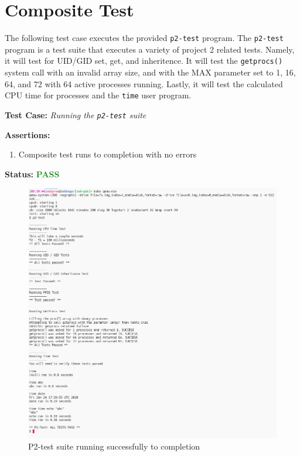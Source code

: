 \documentclass[11pt,letterpaper]{report}
\newcommand{\code}[1]{\colorbox{codegray}{\texttt{#1}}}
\begin{document}
{  \pagebreak

  \section*{Composite Test}
  The following test case executes the provided \code{p2-test} program. 
  The \code{p2-test} program is a test suite that executes a variety of project 2 related
  tests. Namely, it will test for UID/GID set, get, and inheritence. It will test the 
  \code{getprocs()} system call with an invalid array size, and with the MAX parameter
  set to 1, 16, 64, and 72 with 64 active processes running. Lastly, it will test the
  calculated CPU time for processes and the \code{time} user program. \hfill \break
  
  \noindent\textbf{Test Case:} \emph{Running the \code{p2-test} suite}
  
  \noindent\textbf{Assertions:}
  \begin{enumerate}[]
  \item Composite test runs to completion with no errors
  \end{enumerate}  
  
  \noindent\textbf{Status:} \textcolor{ForestGreen}{\textbf{PASS}}
  
  \begin{figure}[h!]
	\centering
	\includegraphics[scale=0.55]{p2-test.png}
	\caption[img]{P2-test suite running successfully to completion}
	\label{fig:P1compileP0-1}
  \end{figure}

\ifdefined \LF
} %
\fi
\end{document}
